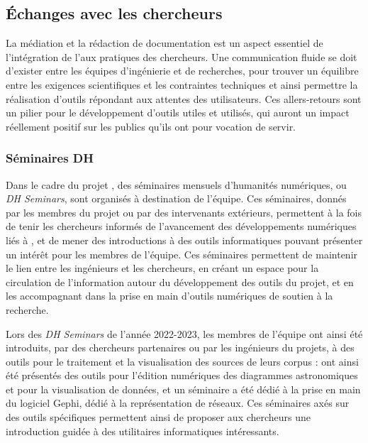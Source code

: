 
\subsection{Échanges avec les chercheurs}
	La médiation et la rédaction de documentation est un aspect essentiel de l'intégration de l'\ia aux pratiques des chercheurs. Une communication fluide se doit d'exister entre les équipes d'ingénierie et de recherches, pour trouver un équilibre entre les exigences scientifiques et les contraintes techniques et ainsi permettre la réalisation d'outils répondant aux attentes des utilisateurs. Ces allers-retours sont un pilier pour le développement d'outils utiles et utilisés, qui auront un impact réellement positif sur les publics qu'ils ont pour vocation de servir. 
	
    \subsubsection{Séminaires DH}
    Dans le cadre du projet \eida, des séminaires mensuels d'humanités numériques, ou \textit{DH Seminars}, sont organisés à destination de l'équipe. Ces séminaires, donnés par les membres du projet ou par des intervenants extérieurs, permettent à la fois de tenir les chercheurs informés de l'avancement des développements numériques liés à \eida, et de mener des introductions à des outils informatiques pouvant présenter un intérêt pour les membres de l'équipe. Ces séminaires permettent de maintenir le lien entre les ingénieurs et les chercheurs, en créant un espace pour la circulation de l'information autour du développement des outils du projet, et en les accompagnant dans la prise en main d'outils numériques de soutien à la recherche.
    
    Lors des \textit{DH Seminars} de l'année 2022-2023, les membres de l'équipe \eida ont ainsi été introduits, par des chercheurs partenaires ou par les ingénieurs du projets, à des outils pour le traitement et la visualisation des sources de leurs corpus : ont ainsi été présentés des outils pour l'édition numériques des diagrammes astronomiques et pour la visualisation de données, et un séminaire a été dédié à la prise en main du logiciel Gephi, dédié à la représentation de réseaux. Ces séminaires axés sur des outils spécifiques permettent ainsi de proposer aux chercheurs une introduction guidée à des utilitaires informatiques intéressants.
    
